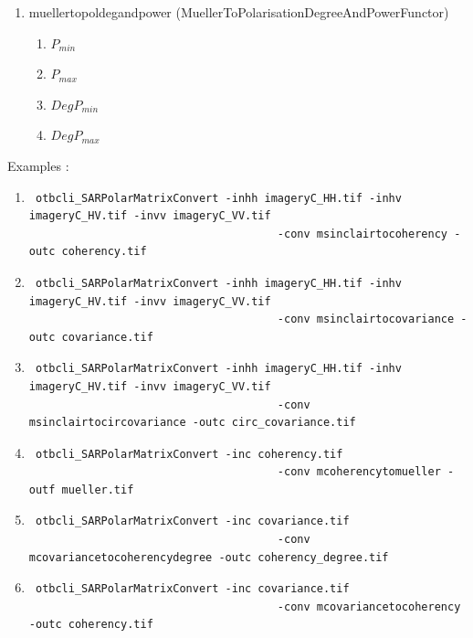 \begin{enumerate}
 
\item muellertopoldegandpower (MuellerToPolarisationDegreeAndPowerFunctor)
\begin{enumerate}
\item $ P_{min} $ 
\item $ P_{max} $ 
\item $ DegP_{min} $ 
\item $ DegP_{max} $
\end{enumerate}

\end{enumerate}

Examples :

\begin{enumerate}
\item \begin{verbatim} otbcli_SARPolarMatrixConvert -inhh imageryC_HH.tif -inhv imageryC_HV.tif -invv imageryC_VV.tif
									  -conv msinclairtocoherency -outc coherency.tif \end{verbatim}
									  
\item \begin{verbatim} otbcli_SARPolarMatrixConvert -inhh imageryC_HH.tif -inhv imageryC_HV.tif -invv imageryC_VV.tif
									  -conv msinclairtocovariance -outc covariance.tif \end{verbatim}
									  
\item \begin{verbatim} otbcli_SARPolarMatrixConvert -inhh imageryC_HH.tif -inhv imageryC_HV.tif -invv imageryC_VV.tif
									  -conv msinclairtocircovariance -outc circ_covariance.tif \end{verbatim}
									  
\item \begin{verbatim} otbcli_SARPolarMatrixConvert -inc coherency.tif 
									  -conv mcoherencytomueller -outf mueller.tif \end{verbatim}
									  
\item \begin{verbatim} otbcli_SARPolarMatrixConvert -inc covariance.tif 
									  -conv mcovariancetocoherencydegree -outc coherency_degree.tif \end{verbatim}
									  
\item \begin{verbatim} otbcli_SARPolarMatrixConvert -inc covariance.tif 
									  -conv mcovariancetocoherency -outc coherency.tif \end{verbatim}
									  

\end{enumerate}
